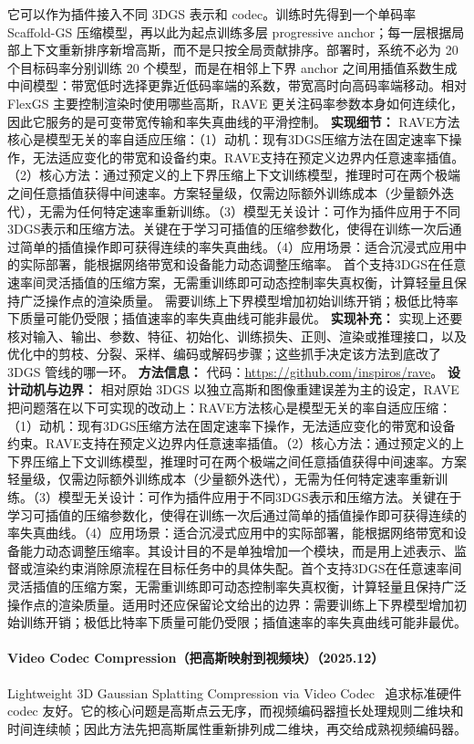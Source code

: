 它可以作为插件接入不同 3DGS 表示和 codec。训练时先得到一个单码率 Scaffold-GS 压缩模型，再以此为起点训练多层 progressive anchor；每一层根据局部上下文重新排序新增高斯，而不是只按全局贡献排序。部署时，系统不必为 20 个目标码率分别训练 20 个模型，而是在相邻上下界 anchor 之间用插值系数生成中间模型：带宽低时选择更靠近低码率端的系数，带宽高时向高码率端移动。相对 FlexGS 主要控制渲染时使用哪些高斯，RAVE 更关注码率参数本身如何连续化，因此它服务的是可变带宽传输和率失真曲线的平滑控制。
\textbf{实现细节：} RAVE方法核心是模型无关的率自适应压缩：（1）动机：现有3DGS压缩方法在固定速率下操作，无法适应变化的带宽和设备约束。RAVE支持在预定义边界内任意速率插值。（2）核心方法：通过预定义的上下界压缩上下文训练模型，推理时可在两个极端之间任意插值获得中间速率。方案轻量级，仅需边际额外训练成本（少量额外迭代），无需为任何特定速率重新训练。（3）模型无关设计：可作为插件应用于不同3DGS表示和压缩方法。关键在于学习可插值的压缩参数化，使得在训练一次后通过简单的插值操作即可获得连续的率失真曲线。（4）应用场景：适合沉浸式应用中的实际部署，能根据网络带宽和设备能力动态调整压缩率。 首个支持3DGS在任意速率间灵活插值的压缩方案，无需重训练即可动态控制率失真权衡，计算轻量且保持广泛操作点的渲染质量。 需要训练上下界模型增加初始训练开销；极低比特率下质量可能仍受限；插值速率的率失真曲线可能非最优。
\textbf{实现补充：} 实现上还要核对输入、输出、参数、特征、初始化、训练损失、正则、渲染或推理接口，以及优化中的剪枝、分裂、采样、编码或解码步骤；这些抓手决定该方法到底改了 3DGS 管线的哪一环。
\textbf{方法信息：} 代码：\url{https://github.com/inspiros/rave}。
\textbf{设计动机与边界：} 相对原始 3DGS 以独立高斯和图像重建误差为主的设定，RAVE 把问题落在以下可实现的改动上：RAVE方法核心是模型无关的率自适应压缩：（1）动机：现有3DGS压缩方法在固定速率下操作，无法适应变化的带宽和设备约束。RAVE支持在预定义边界内任意速率插值。（2）核心方法：通过预定义的上下界压缩上下文训练模型，推理时可在两个极端之间任意插值获得中间速率。方案轻量级，仅需边际额外训练成本（少量额外迭代），无需为任何特定速率重新训练。（3）模型无关设计：可作为插件应用于不同3DGS表示和压缩方法。关键在于学习可插值的压缩参数化，使得在训练一次后通过简单的插值操作即可获得连续的率失真曲线。（4）应用场景：适合沉浸式应用中的实际部署，能根据网络带宽和设备能力动态调整压缩率。其设计目的不是单独增加一个模块，而是用上述表示、监督或渲染约束消除原流程在目标任务中的具体失配。首个支持3DGS在任意速率间灵活插值的压缩方案，无需重训练即可动态控制率失真权衡，计算轻量且保持广泛操作点的渲染质量。适用时还应保留论文给出的边界：需要训练上下界模型增加初始训练开销；极低比特率下质量可能仍受限；插值速率的率失真曲线可能非最优。
\paragraph{Video Codec Compression（把高斯映射到视频块）（2025.12）}
Lightweight 3D Gaussian Splatting Compression via Video Codec~\cite{2512_11186} 追求标准硬件 codec 友好。它的核心问题是高斯点云无序，而视频编码器擅长处理规则二维块和时间连续帧；因此方法先把高斯属性重新排列成二维块，再交给成熟视频编码器。

